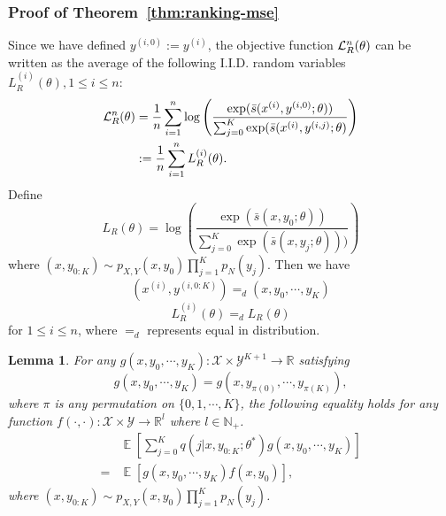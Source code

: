 \documentclass[11pt,a4paper]{article}
\DeclareMathOperator{\E}{\mathbb{E}}
\newcommand{\objr}{{\cal L}_R^n}
\newcommand{\q}[1]{q(#1|x, y_{0:K}; \theta^*)}
\newcommand{\ssf}[3]{\bar{s}(#1, #2; #3)}
\newtheorem{lemma}{Lemma}[section]
\begin{document}
\subsubsection{Proof of Theorem~\ref{thm:ranking-mse}}
\label{sec:pf-ranking-mse}
Since we have defined $y^{(i, 0)} := y^{(i)}$, the objective function $\objr(\theta )$ can be written as the average of the following I.I.D. random variables $ L^{(i)}_R(\theta), 1\leq i \leq n$:  
\begin{equation}
\begin{aligned}
\objr(\theta ) &= \frac{1}{n}\sum_{i=1}^n  \log\left(\frac{\exp( \ssf{x^{(i)}}{y^{(i, 0)}}{\theta} )}{\sum_{j=0}^K \exp( \ssf{x^{(i)}} {y^{(i, j)}} {\theta} }\right) \\
&  := \frac{1}{n}\sum_{i=1}^n L^{(i)}_R(\theta). 
\end{aligned}
\end{equation}
Define 
\[
L_R(\theta) = \log \left( \frac{\exp(\ssf{x}{y_0}{\theta})}{\sum_{j=0}^K \exp(\ssf{x}{y_j}{\theta}) ) }\right)
\]
where $(x, y_{0:K}) \sim p_{X, Y}(x, y_0)\prod_{j=1}^K p_N(y_j)$. Then we have 
\[
(x^{(i)}, y^{(i, 0:K)}) =_d (x, y_0, \cdots, y_K) 
\]
\[
L^{(i)}_R(\theta) =_d L_R(\theta)
\]
for $1\leq i \leq n$, where $=_d$ represents equal in distribution. 

\begin{lemma}
For any $g(x, y_0, \cdots, y_K): \mathcal{X}\times\mathcal{Y}^{K+1} \rightarrow \mathbb{R}$ satisfying  
$$g(x, y_0, \cdots, y_K) = g(x, y_{\pi(0)}, \cdots, y_{\pi(K)}),$$
where $\pi$ is any permutation on $\{0, 1, \cdots, K\}$, the following equality holds for any function 
$f(\cdot, \cdot): \mathcal{X}\times\mathcal{Y} \rightarrow \mathbb{R}^l$ where $l\in\mathbb{N}_+$.
\begin{equation}
\begin{aligned}
  & \E \left[  \sum_{j=0}^K \q{j} g(x, y_0, \cdots, y_K)  \right] 
  \\
  = & \E \left[g(x, y_0, \cdots, y_K)f(x, y_0) \right], 
\end{aligned}
\end{equation}
where $(x, y_{0:K}) \sim p_{X, Y}(x, y_0)\prod_{j=1}^K p_N(y_j)$. 
\label{lem:integral-rank}
\end{lemma}
\end{document}
